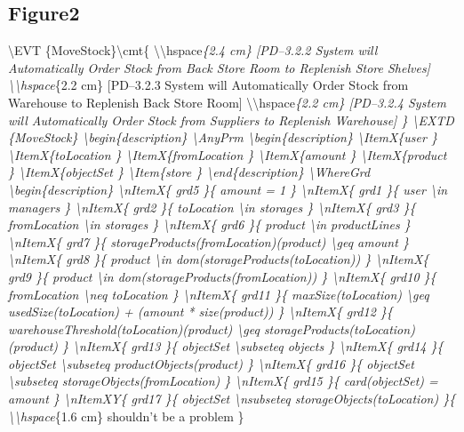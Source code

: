 \subsection{Figure2}
\label{figure2}

\textbackslash{}EVT \{MoveStock\}\textbackslash{}cmt\{ \textbackslash{}\textbackslash{}hspace\emph{\{2.4 cm\} [PD--3.2.2 System will Automatically Order Stock from Back Store Room to Replenish Store Shelves]
\textbackslash{}\textbackslash{}hspace}\{2.2
cm\} [PD--3.2.3 System will Automatically Order Stock from Warehouse to Replenish Back Store Room]
\textbackslash{}\textbackslash{}hspace\emph{\{2.2 cm\} [PD--3.2.4 System will Automatically Order Stock from Suppliers to Replenish Warehouse] \}
\textbackslash{}EXTD \{MoveStock\}
\textbackslash{}begin\{description\}
\textbackslash{}AnyPrm
\textbackslash{}begin\{description\}
\textbackslash{}ItemX\{user \}
\textbackslash{}ItemX\{toLocation \}
\textbackslash{}ItemX\{fromLocation \}
\textbackslash{}ItemX\{amount \}
\textbackslash{}ItemX\{product \}
\textbackslash{}ItemX\{objectSet \}
\textbackslash{}Item\{store \}
\textbackslash{}end\{description\}
\textbackslash{}WhereGrd
\textbackslash{}begin\{description\}
\textbackslash{}nItemX\{ grd5 \}\{ amount = 1 \}
\textbackslash{}nItemX\{ grd1 \}\{ user \textbackslash{}in managers \}
\textbackslash{}nItemX\{ grd2 \}\{ toLocation \textbackslash{}in storages \}
\textbackslash{}nItemX\{ grd3 \}\{ fromLocation \textbackslash{}in storages \}
\textbackslash{}nItemX\{ grd6 \}\{ product \textbackslash{}in productLines \}
\textbackslash{}nItemX\{ grd7 \}\{ storageProducts(fromLocation)(product) \textbackslash{}geq amount \}
\textbackslash{}nItemX\{ grd8 \}\{ product \textbackslash{}in dom(storageProducts(toLocation)) \}
\textbackslash{}nItemX\{ grd9 \}\{ product \textbackslash{}in dom(storageProducts(fromLocation)) \}
\textbackslash{}nItemX\{ grd10 \}\{ fromLocation \textbackslash{}neq toLocation \}
\textbackslash{}nItemX\{ grd11 \}\{ maxSize(toLocation) \textbackslash{}geq usedSize(toLocation) + (amount * size(product)) \}
\textbackslash{}nItemX\{ grd12 \}\{ warehouseThreshold(toLocation)(product) \textbackslash{}geq storageProducts(toLocation)(product) \}
\textbackslash{}nItemX\{ grd13 \}\{ objectSet \textbackslash{}subseteq objects \}
\textbackslash{}nItemX\{ grd14 \}\{ objectSet \textbackslash{}subseteq productObjects(product) \}
\textbackslash{}nItemX\{ grd16 \}\{ objectSet \textbackslash{}subseteq storageObjects(fromLocation) \}
\textbackslash{}nItemX\{ grd15 \}\{ card(objectSet) = amount \}
\textbackslash{}nItemXY\{ grd17 \}\{ objectSet \textbackslash{}nsubseteq storageObjects(toLocation) \}\{ \textbackslash{}\textbackslash{}hspace}\{1.6 cm\} shouldn't be a problem \}
